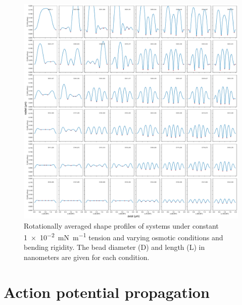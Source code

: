 \documentclass[11pt]{article}
\begin{document}
\begin{figure}[htbp!]
    \includegraphics[width=\textwidth]{writeup/Figures/final_shapes_tension1.pdf}
    \caption{Rotationally averaged shape profiles of systems under constant \SI{1e-2}{\milli\newton\per\meter} tension and varying osmotic conditions and bending rigidity.
     The bead diameter (D) and length (L) in nanometers are given for each condition.}
    \label{fig:tension01shapes}
\end{figure}

\section{Action potential propagation}
\end{document}
